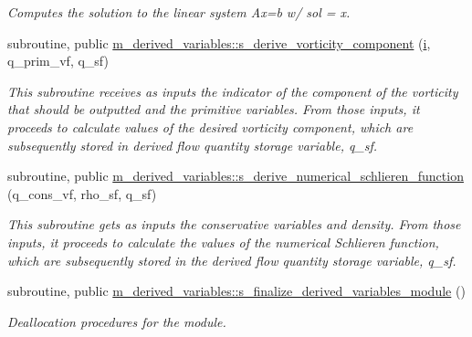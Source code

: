 \begin{Indent}
\begin{DoxyCompactItemize}
\begin{DoxyCompactList}\small\item\em Computes the solution to the linear system Ax=b w/ sol = x. \end{DoxyCompactList}\item 
subroutine, public \hyperlink{namespacem__derived__variables_aa038ec37a8a0c8fe8d7185b9ef6d54a9}{m\+\_\+derived\+\_\+variables\+::s\+\_\+derive\+\_\+vorticity\+\_\+component} (\hyperlink{m__data__output_8f90_aaea4baed8fd8b780f6938f0dc1fb0f72}{i}, q\+\_\+prim\+\_\+vf, q\+\_\+sf)
\begin{DoxyCompactList}\small\item\em This subroutine receives as inputs the indicator of the component of the vorticity that should be outputted and the primitive variables. From those inputs, it proceeds to calculate values of the desired vorticity component, which are subsequently stored in derived flow quantity storage variable, q\+\_\+sf. \end{DoxyCompactList}\item 
subroutine, public \hyperlink{namespacem__derived__variables_af816bc88ed55a050bfe8f2ab94d89cba}{m\+\_\+derived\+\_\+variables\+::s\+\_\+derive\+\_\+numerical\+\_\+schlieren\+\_\+function} (q\+\_\+cons\+\_\+vf, rho\+\_\+sf, q\+\_\+sf)
\begin{DoxyCompactList}\small\item\em This subroutine gets as inputs the conservative variables and density. From those inputs, it proceeds to calculate the values of the numerical Schlieren function, which are subsequently stored in the derived flow quantity storage variable, q\+\_\+sf. \end{DoxyCompactList}\item 
subroutine, public \hyperlink{namespacem__derived__variables_a735665bf598281689158d9d6e075f3d4}{m\+\_\+derived\+\_\+variables\+::s\+\_\+finalize\+\_\+derived\+\_\+variables\+\_\+module} ()
\begin{DoxyCompactList}\small\item\em Deallocation procedures for the module. \end{DoxyCompactList}\end{DoxyCompactItemize}
\end{Indent}
